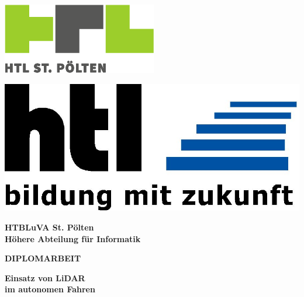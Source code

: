 \pagestyle{empty}
\singlespacing
\sffamily

\begin{flushleft}
	\includegraphics[scale=0.40]{images/HTLstp-RGB.png} \\
\end{flushleft}

\vspace{-2.5cm}

\begin{flushright}
	\includegraphics[scale=0.10]{images/HTL.jpg} \\
\end{flushright}

\vspace{-2.7cm}

\begin{center}
    \textbf{HTBLuVA St. Pölten}\\
    \textbf{Höhere Abteilung für Informatik}
\end{center}

\vspace{-0.7cm}
\hrulefill

\begin{center}
    \vspace{2cm}
    \huge
    \textbf{DIPLOMARBEIT}
    
    \huge
    \textbf{Einsatz von LiDAR\\im autonomen Fahren}
    
\end{center}

